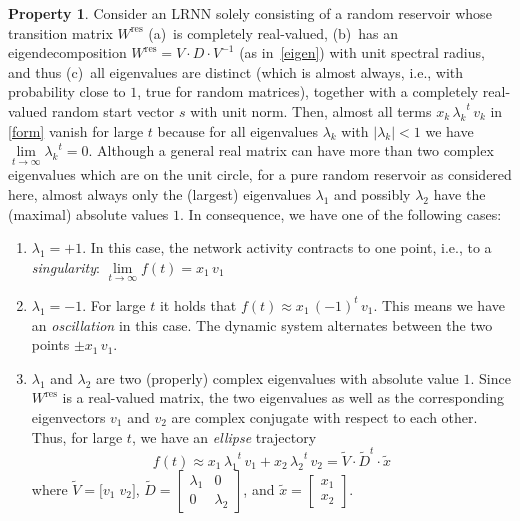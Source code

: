 \documentclass{sn-jnl}
\theoremstyle{definition}
\newtheorem{prop}{Property}
\begin{document}
\begin{prop}\label{infty}
Consider an LRNN solely consisting of a random reservoir whose transition matrix
$W^\mathrm{res}$ (a)~is completely real-valued, (b)~has an eigendecomposition
$W^\mathrm{res} = V \cdot D \cdot V^{-1}$ (as in~\cref{eigen})
with unit spectral radius, and thus (c)~all eigenvalues are distinct (which is
almost always, i.e., with probability close to $1$, true for random matrices),
together with a completely real-valued random start vector $s$ with unit norm.
Then, almost all terms $x_k\,{\lambda_k}^t\,v_k$ in \cref{form} vanish for large
$t$ because for all eigenvalues $\lambda_k$ with $|\lambda_k| < 1$ we have
$\lim\limits_{t \to \infty} {\lambda_k}^t = 0$. Although a general real matrix
can have more than two complex eigenvalues which are on the unit circle, for a
pure random reservoir as considered here, almost always only the (largest)
eigenvalues $\lambda_1$ and possibly $\lambda_2$ have the (maximal) absolute
values $1$. In consequence, we have one of the following cases:
\begin{enumerate}
  \item $\lambda_1 = +1$. In this case, the network activity contracts to one
	point, i.e., to a \emph{singularity}: $\lim\limits_{t \to \infty}
	f(t) = x_1\,v_1$
  \item $\lambda_1 = -1$. For large $t$ it holds that $f(t) \approx
	x_1\,(-1)^t\,v_1$. This means we have an \emph{oscillation} in this
	case. The dynamic system alternates between the two points $\pm x_1\,v_1$.
  \item $\lambda_1$ and $\lambda_2$ are two (properly) complex eigenvalues with
	absolute value $1$. Since $W^\mathrm{res}$ is a real-valued matrix, the two
	eigenvalues as well as the corresponding eigenvectors $v_1$ and $v_2$
	are complex conjugate with respect to each other. Thus, for large $t$, we
	have an \emph{ellipse} trajectory
	\[
		f(t) \approx x_1\,{\lambda_1}^t\,v_1 + x_2\,{\lambda_2}^t\,v_2
		= \tilde{V} \cdot \tilde{D}^t \cdot \tilde{x}
	\]
	where $\tilde{V} = \big[ v_1\;v_2 \big]$, $\tilde{D} = \left[
	\begin{array}{cc} \lambda_1 & 0 \\ 0 & \lambda_2 \end{array} \right]$,
	and $\tilde{x} = \left[ \begin{array}{c} x_1 \\ x_2 \end{array}
	\right]$.
\end{enumerate}
\end{prop}
\end{document}
